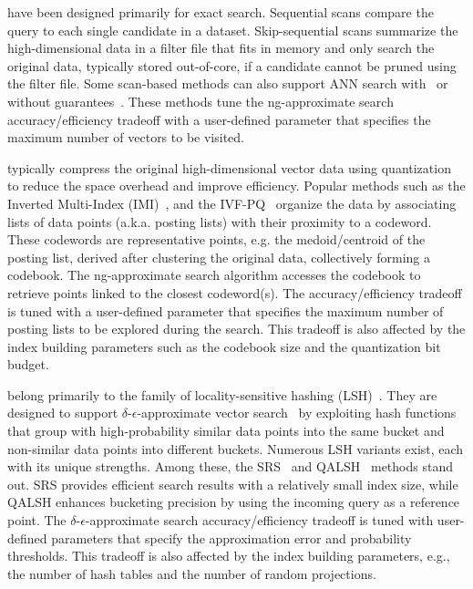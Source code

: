  have been designed primarily for exact search. Sequential scans compare the query to each single candidate in a dataset. 
Skip-sequential scans summarize the high-dimensional data in a filter file that fits in memory and only search the original data, typically stored out-of-core, if a candidate cannot be pruned using the filter file. 
Some scan-based methods can also support ANN search with~\cite{lernaeanhydra2} or without guarantees~\cite{lernaeanhydra2,vafile,va+file}. These methods tune the ng-approximate search accuracy/efficiency tradeoff with a user-defined parameter that specifies the maximum number of vectors to be visited. 

 typically compress the original high-dimensional vector data using quantization to reduce the space overhead and improve efficiency. 
Popular methods such as the Inverted Multi-Index (IMI)~\cite{journal/pami/babenko15}, and the IVF-PQ~\cite{gist} organize the data by associating lists of data points (a.k.a. posting lists) with their proximity to a codeword. 
These codewords are representative points, e.g. the medoid/centroid of the posting list, derived after clustering the original data, collectively forming a codebook. The
ng-approximate search algorithm accesses the codebook to retrieve points linked to the closest codeword(s).
The accuracy/efficiency tradeoff is tuned with a user-defined parameter that specifies the maximum number of posting lists to be explored during the search. 
This tradeoff is also affected by the index building parameters such as the codebook size and the quantization bit budget. 

 belong primarily to the family of locality-sensitive hashing (LSH)~\cite{conf/stoc/indyk1998,lsh-survey}. 
They are designed to support $\delta$-$\epsilon$-approximate vector search~\cite{lernaeanhydra2} by exploiting hash functions that group with high-probability similar data points into the same bucket and non-similar data points into different buckets. 
Numerous LSH variants exist, each with its unique strengths. 
Among these, the SRS~\cite{srs} and QALSH~\cite{qalsh} methods stand out. SRS provides efficient search results with a relatively small index size, while QALSH enhances bucketing precision by using the incoming query as a reference point. 
The $\delta$-$\epsilon$-approximate search accuracy/efficiency tradeoff is tuned with user-defined parameters that specify the approximation error and probability thresholds. 
This tradeoff is also affected by the index building parameters, e.g., the number of hash tables and the number of random projections.

